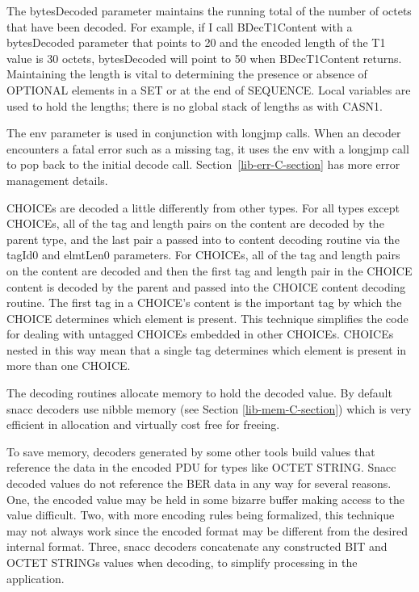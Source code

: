 The {\C bytesDecoded} parameter maintains the running total of the
number of octets that have been decoded.  For example, if I call
{\C BDecT1Content} with a {\C bytesDecoded} parameter that points
to 20 and the encoded length of the {\C T1} value is 30 octets,
{\C bytesDecoded} will point to 50 when {\C BDecT1Content}
returns.  Maintaining the length is vital to determining the presence
or absence of OPTIONAL elements in a SET or at the end of SEQUENCE\@.
Local variables are used to hold the lengths; there is no global stack
of lengths as with CASN1.

The {\C env} parameter is used in conjunction with {\C longjmp}
calls.  When an decoder encounters a fatal error such as a missing
tag, it uses the {\C env} with a {\C longjmp} call to pop back to the
initial decode call. Section~\ref{lib-err-C-section} has more error
management details.

CHOICEs are decoded a little differently from other types.  For all
types except CHOICEs, all of the tag and length pairs on the content
are decoded by the parent type, and the last pair a passed into to
content decoding routine via the {\C tagId0} and {\C elmtLen0}
parameters.  For CHOICEs, all of the tag and length pairs on the
content are decoded and then the first tag and length pair in the
CHOICE content is decoded by the parent and passed into the CHOICE
content decoding routine.  The first tag in a CHOICE's content is the
important tag by which the CHOICE determines which element is present.
This technique simplifies the code for dealing with untagged CHOICEs
embedded in other CHOICEs.  CHOICEs nested in this way mean that a
single tag determines which element is present in more than one
CHOICE\@.

The decoding routines allocate memory to hold the decoded value.  By
default snacc decoders use nibble memory (see Section
\ref{lib-mem-C-section}) which is very efficient in allocation and
virtually cost free for freeing.

To save memory, decoders generated by some other tools build values
that reference the data in the encoded PDU for types like OCTET
STRING\@.  Snacc decoded values do not reference the BER data in any way
for several reasons.  One, the encoded value may be held in some
bizarre buffer making access to the value difficult.  Two, with more
encoding rules being formalized, this technique may not always work
since the encoded format may be different from the desired internal
format.  Three, snacc decoders concatenate any constructed BIT and
OCTET STRINGs values when decoding, to simplify processing in the
application.

